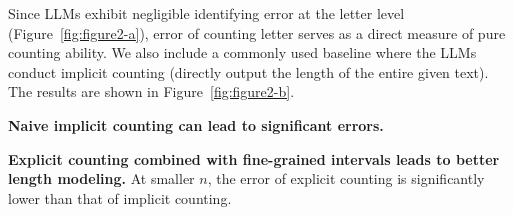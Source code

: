 Since LLMs exhibit negligible identifying error at the letter level (Figure~\ref{fig:figure2-a}), error of counting letter serves as a direct measure of pure counting ability. We also include a commonly used baseline where the LLMs conduct implicit counting (directly output the length of the entire given text). The results are shown in Figure~\ref{fig:figure2-b}.

\begin{finding}
\label{find3}
\textbf{Naive implicit counting can lead to significant errors.} 
\end{finding}

\begin{finding}
\label{find4}
\textbf{Explicit counting combined with fine-grained intervals leads to better length modeling.}  At smaller \( n \), the error of explicit counting is significantly lower than that of implicit counting.
\end{finding}


